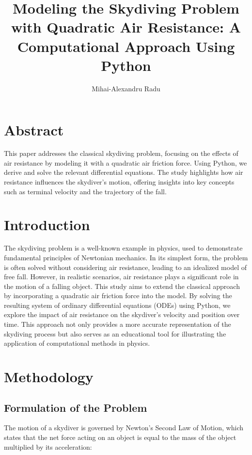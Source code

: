 \documentclass{article}
\title{Modeling the Skydiving Problem with Quadratic Air Resistance: A Computational Approach Using Python}
\author{Mihai-Alexandru Radu}
\begin{document}
\maketitle

\section*{Abstract}

This paper addresses the classical skydiving problem, focusing on the effects of air resistance by modeling it with a quadratic air friction force. Using Python, we derive and solve the relevant differential equations. The study highlights how air resistance influences the skydiver's motion, offering insights into key concepts such as terminal velocity and the trajectory of the fall.

\section*{Introduction}

The skydiving problem is a well-known example in physics, used to demonstrate fundamental principles of Newtonian mechanics. In its simplest form, the problem is often solved without considering air resistance, leading to an idealized model of free fall. However, in realistic scenarios, air resistance plays a significant role in the motion of a falling object. This study aims to extend the classical approach by incorporating a quadratic air friction force into the model. By solving the resulting system of ordinary differential equations (ODEs) using Python, we explore the impact of air resistance on the skydiver's velocity and position over time. This approach not only provides a more accurate representation of the skydiving process but also serves as an educational tool for illustrating the application of computational methods in physics.

\section*{Methodology}

\subsection*{Formulation of the Problem}

The motion of a skydiver is governed by Newton's Second Law of Motion, which states that the net force acting on an object is equal to the mass of the object multiplied by its acceleration:
\end{document}
